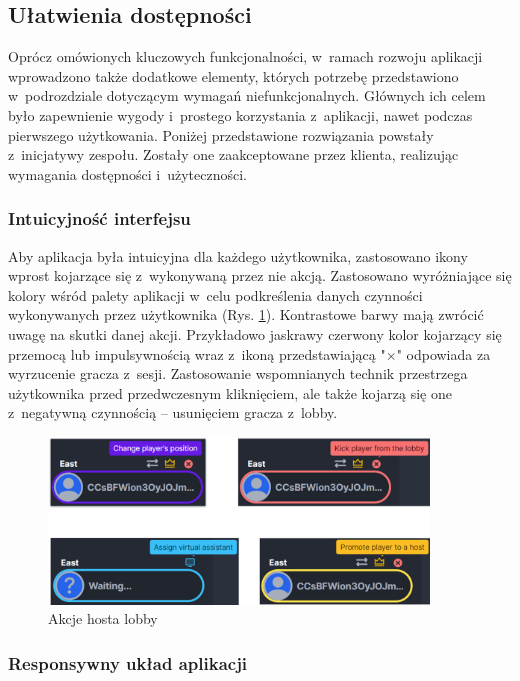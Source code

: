 \subsection{Ułatwienia dostępności}

Oprócz omówionych kluczowych funkcjonalności, w~ramach rozwoju
aplikacji wprowadzono także dodatkowe elementy, których
potrzebę przedstawiono w~podrozdziale dotyczącym wymagań
niefunkcjonalnych. Głównych ich celem było zapewnienie
wygody i~prostego korzystania z~aplikacji, nawet podczas
pierwszego użytkowania. Poniżej przedstawione rozwiązania powstały
z~inicjatywy zespołu. Zostały one zaakceptowane przez klienta,
realizując wymagania dostępności i~użyteczności.

\subsubsection{Intuicyjność interfejsu}

Aby aplikacja była intuicyjna dla każdego użytkownika,
zastosowano ikony wprost kojarzące się z~wykonywaną
przez nie akcją. Zastosowano wyróżniające się kolory wśród palety
aplikacji w~celu podkreślenia danych czynności wykonywanych
przez użytkownika (Rys. \ref{fig:host_actions_ui}). Kontrastowe barwy mają zwrócić uwagę na
skutki danej akcji. Przykładowo jaskrawy czerwony kolor
kojarzący się przemocą lub impulsywnością wraz z~ikoną
przedstawiającą "$\times$"\xspace odpowiada za wyrzucenie gracza
z~sesji. Zastosowanie wspomnianych technik przestrzega
użytkownika przed przedwczesnym kliknięciem, ale także kojarzą
się one z~negatywną czynnością -- usunięciem gracza z~lobby.

\begin{figure}[h!]
  \centering
  \includegraphics[width=0.9\textwidth]{img/widoki/host_actions.png}
  \caption{Akcje hosta lobby}
  \label{fig:host_actions_ui}
\end{figure}

\FloatBarrier

\subsubsection{Responsywny układ aplikacji}

